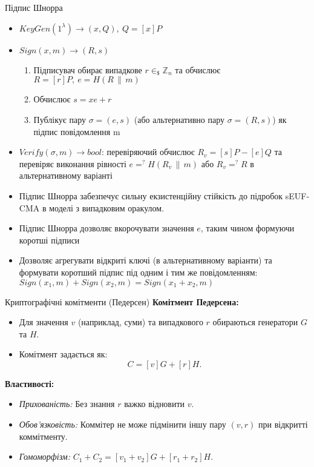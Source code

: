 \documentclass[9pt]{beamer}
\begin{document}
\begin{darkframes}
\begin{frame}{Підпис Шнорра}
  \begin{itemize}
  \item $KeyGen(1^\lambda) \rightarrow (x,Q),\ Q=[x]P$
  \item $Sign(x, m) \rightarrow (R, s)$
  \begin{enumerate}
      \item Підписувач обирає випадкове $r\in_\$ \mathbb{Z}_n$ та обчислює $R=[r]P,\ e=H(R \, \|\, m)$
      \item Обчислює $s=xe + r$
      \item Публікує пару $\sigma=(e,s)$ (або альтернативно пару $\sigma = (R, s)$) як підпис повідомлення m
  \end{enumerate}
  \item $Verify(\sigma, m) \rightarrow bool$: перевіряючий обчислює $R_v = [s]P - [e]Q$ та перевіряє виконання рівності $e=^?H(R_v \, \|\, m)$ або $R_v =^? R$ в альтернативному варіанті
    \item Підпис Шнорра забезпечує сильну екзистенційну стійкість до підробок sEUF-CMA в моделі з випадковим оракулом.
    \item Підпис Шнорра дозволяє вкорочувати значення $e$, таким чином формуючи коротші підписи
    \item Дозволяє агрегувати відкриті ключі (в альтернативному варіанти) та формувати коротший підпис під одним і тим же повідомленням: $Sign(x_1, m) + Sign(x_2,m) = Sign(x_1+x_2,m)$
  \end{itemize}
\end{frame}
\begin{frame}{Криптографічні комітменти (Педерсен)}
  \textbf{Комітмент Педерсена:}
  \begin{itemize}
    \item Для значення \(v\) (наприклад, суми) та випадкового \(r\) обираються генератори \(G\) та \(H\).
    \item Комітмент задається як:
      \[
      C = [v]G + [r]H.
      \]
  \end{itemize}
  \vspace{0.3cm}
  \textbf{Властивості:}
  \begin{itemize}
    \item \emph{Прихованість:} Без знання \(r\) важко відновити \(v\).
    \item \emph{Обов'язковість:} Коммітер не може підмінити іншу пару $(v,r)$ при відкритті коммітменту.
    \item \emph{Гомоморфізм:} \(C_1 + C_2 = [v_1+v_2]G + [r_1+r_2]H\).
  \end{itemize}
  

\end{frame}
\end{darkframes}
\end{document}

